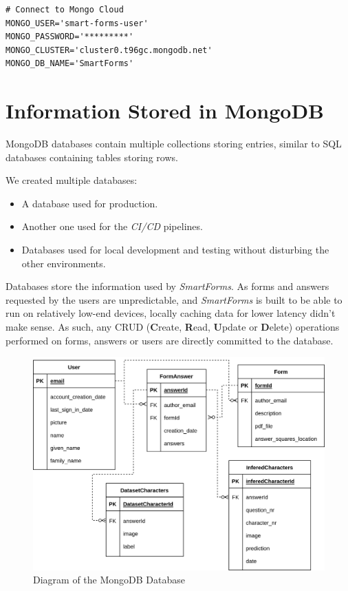 \documentclass[11pt, a4paper]{report}
\begin{document}
\begin{verbatim}
# Connect to Mongo Cloud
MONGO_USER='smart-forms-user'
MONGO_PASSWORD='*********'
MONGO_CLUSTER='cluster0.t96gc.mongodb.net'
MONGO_DB_NAME='SmartForms'
\end{verbatim}

\section{Information Stored in MongoDB}

MongoDB databases contain multiple collections storing entries, similar to SQL databases containing tables storing rows.

We created multiple databases:
\begin{itemize}
    \item A database used for production.
    \item Another one used for the \textit{CI/CD} pipelines.
    \item Databases used for local development and testing without disturbing the other environments. 
\end{itemize}

Databases store the information used by \textit{SmartForms}. As forms and answers requested by the users are unpredictable, and \textit{SmartForms} is built to be able to run on relatively low-end devices, locally caching data for lower latency didn't make sense. As such, any CRUD (\textbf{C}reate, \textbf{R}ead, \textbf{U}pdate or \textbf{D}elete) operations performed on forms, answers or users are directly committed to the database.
\\

\begin{figure}[!h]
    \centering
    \includegraphics[width=35em]{images/diagrams/ER_diagram.png}
    \caption{Diagram of the MongoDB Database}
    \label{fig:label}
\end{figure}
\end{document}
